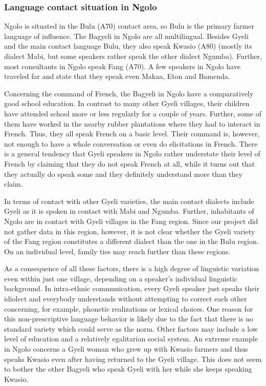 \subsubsection{Language contact situation in Ngolo} 
Ngolo is situated in the Bulu (A70) contact area, so Bulu is the primary farmer language of influence. The Bagyeli in Ngolo are all multilingual. Besides Gyeli and the main contact language Bulu, they also speak Kwasio (A80) (mostly its dialect Mabi, but some speakers rather speak the other dialect Ngumba). Further, most consultants in Ngolo speak Fang (A70). A few speakers in Ngolo have traveled far and state that they speak even Makaa, Eton and Bamenda. %

Concerning the command of French, the Bagyeli in Ngolo have a comparatively good school education. In contrast to many other Gyeli villages, their children have attended school more or less regularly for a couple of years. Further, some of them have worked in the nearby rubber plantations where they had to interact in French. Thus, they all speak French on a basic level. Their command is, however, not enough to have a whole conversation or even do elicitations in French. There is a general tendency that Gyeli speakers in Ngolo rather understate their level of French by claiming that they do not speak French at all, while it turns out that they actually do speak some and they definitely understand more than they claim. 

In terms of contact with other Gyeli varieties, the main contact dialects include Gyeli as it is spoken in contact with Mabi and Ngumba. Further, inhabitants of Ngolo are in contact with Gyeli villages in the Fang region. Since our project did not gather data in this region, however, it is not clear whether the Gyeli variety of the Fang region constitutes a different dialect than the one in the Bulu region. On an individual level, family ties may reach further than these regions. 

As a consequence of all these factors, there is a high degree of linguistic variation even within just one village, depending on a speaker's individual linguistic background.
In intra-ethnic communication, every Gyeli speaker just speaks their idiolect and everybody understands without attempting to correct each other concerning,  for example,  phonetic realizations or lexical choices. One reason for this non-prescriptive language behavior is likely due to the fact that there is no standard variety which could serve as the norm.  Other factors may include a low level of education and a relatively egalitarian social system. An extreme example in Ngolo concerns a Gyeli woman who grew up with Kwasio farmers and thus speaks Kwasio even after having returned to the Gyeli village. This does not seem to bother the other Bagyeli who speak Gyeli with her while she keeps speaking Kwasio. 


